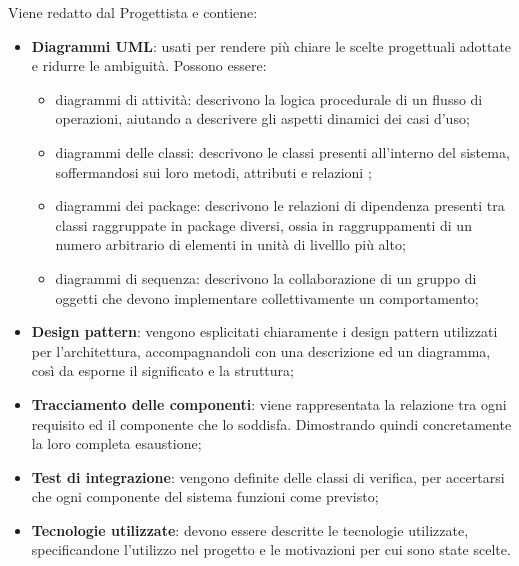   Viene redatto dal Progettista e contiene:
  \begin{itemize}
   	 	\item{\textbf{Diagrammi UML}}: usati per rendere più chiare le scelte progettuali adottate e ridurre le ambiguità. Possono essere:
       		\begin{itemize}
               	\item{diagrammi di attività}: descrivono la logica procedurale di un flusso di operazioni, aiutando a descrivere gli aspetti dinamici dei casi d'uso; 
    			\item{diagrammi delle classi:} descrivono le classi presenti all'interno del sistema, soffermandosi sui loro metodi, attributi e relazioni ; 
    			\item{diagrammi dei package}: descrivono le relazioni di dipendenza presenti tra classi raggruppate in package diversi, ossia in raggruppamenti di un numero arbitrario di elementi in unità di livelllo più alto;  			
				\item{diagrammi di sequenza}: descrivono la collaborazione di un gruppo di oggetti che devono implementare collettivamente un comportamento;                  
			\end{itemize}
			
		\item \textbf{Design pattern}: vengono esplicitati chiaramente i design pattern utilizzati per l'architettura, accompagnandoli con una descrizione ed un diagramma, così da esporne il significato e la struttura; 
		\item \textbf{Tracciamento delle componenti}: viene rappresentata la relazione tra ogni requisito ed il componente che lo soddisfa. Dimostrando quindi concretamente la loro completa esaustione;
		\item \textbf{Test di integrazione}: vengono definite delle classi di verifica, per accertarsi che ogni componente del sistema funzioni come previsto; 
		\item \textbf{Tecnologie utilizzate}: devono essere descritte le tecnologie utilizzate, specificandone l'utilizzo nel progetto e le motivazioni per cui sono state scelte. 
  \end{itemize}
  
